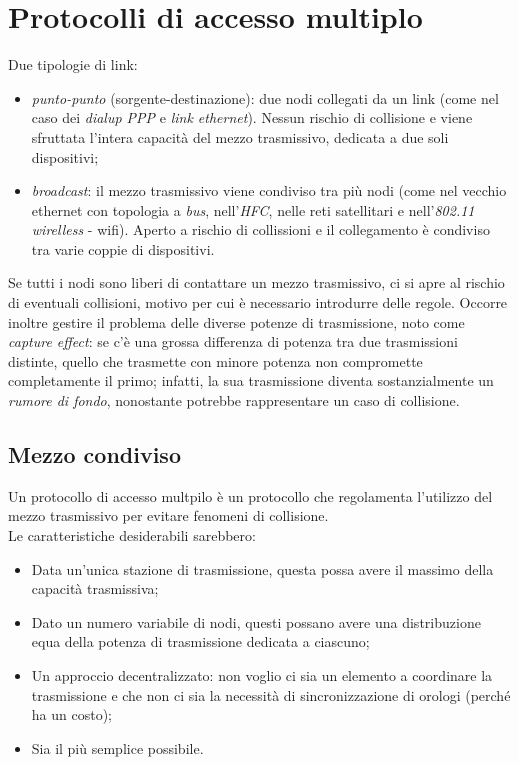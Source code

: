 \section{Protocolli di accesso multiplo}
Due tipologie di link:
\begin{itemize}
	\item \textit{punto-punto} (sorgente-destinazione): due nodi collegati da un link (come nel caso dei \textit{dialup PPP} e \textit{link ethernet}). Nessun rischio di collisione e viene sfruttata l'intera capacità del mezzo trasmissivo, dedicata a due soli dispositivi;
	\item \textit{broadcast}: il mezzo trasmissivo viene condiviso tra più nodi (come nel vecchio ethernet con topologia a \textit{bus}, nell'\textit{HFC}, nelle reti satellitari e nell'\textit{802.11 wirelless} - wifi). Aperto a rischio di collissioni e il collegamento è condiviso tra varie coppie di dispositivi.
\end{itemize}
Se tutti i nodi sono liberi di contattare un mezzo trasmissivo, ci si apre al rischio di eventuali collisioni, motivo per cui è necessario introdurre delle regole. Occorre inoltre gestire il problema delle diverse potenze di trasmissione, noto come \textit{capture effect}: se c'è una grossa differenza di potenza tra due trasmissioni distinte, quello che trasmette con minore potenza non compromette completamente il primo; infatti, la sua trasmissione diventa sostanzialmente un \textit{rumore di fondo}, nonostante potrebbe rappresentare un caso di collisione.

\subsection{Mezzo condiviso}
Un protocollo di accesso multpilo è un protocollo che regolamenta l'utilizzo del mezzo trasmissivo per evitare fenomeni di collisione. \\
Le caratteristiche desiderabili sarebbero:
\begin{itemize}
	\item Data un'unica stazione di trasmissione, questa possa avere il massimo della capacità trasmissiva;
	\item Dato un numero variabile di nodi, questi possano avere una distribuzione equa della potenza di trasmissione dedicata a ciascuno;
	\item Un approccio decentralizzato: non voglio ci sia un elemento a coordinare la trasmissione e che non ci sia la necessità di sincronizzazione di orologi (perché ha un costo);
	\item Sia il più semplice possibile.
\end{itemize}
\newpage

